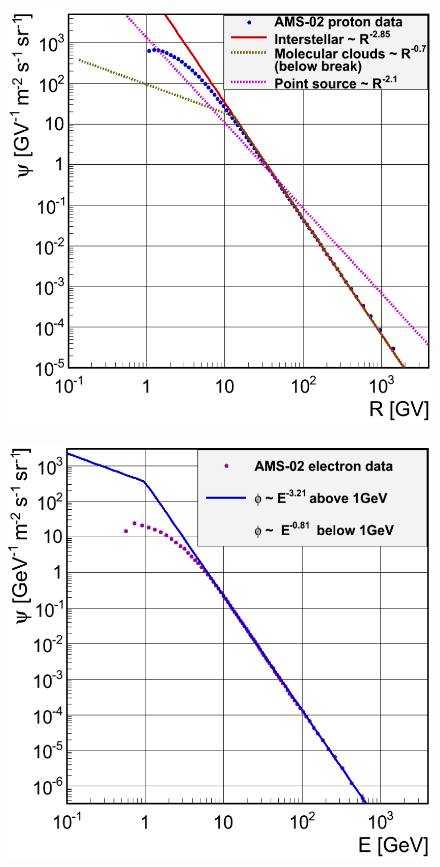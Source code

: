 \begin{figure}[h]
  \centering
  \begin{minipage}[h]{0.45\textwidth}
  	\centering
	\includegraphics[width=1.\linewidth]{pic/method/proton_shapes.png}
 	\label{fig:proton_spec}
  \end{minipage}
  \hfill
  \begin{minipage}[h]{0.45\textwidth}
	  \centering
	  \includegraphics[width=1.\linewidth]{pic/method/el_shapes.png}
	  \label{fig:electron_spec}
  \end{minipage}
\end{figure}


